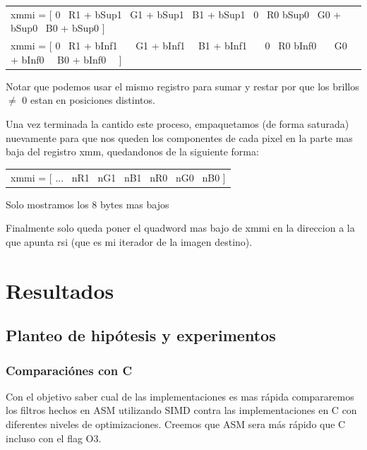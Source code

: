 \documentclass[a4paper]{article}
\begin{document}
\begin{center}
	\begin{tabular}{l}
		xmmi = [ 0 \textpipe\ R1 + bSup1 \textpipe\ G1 + bSup1 \textpipe\ B1 + bSup1 \textpipe\ 0 \textpipe\ R0 bSup0 \textpipe\ G0 + bSup0 \textpipe\ B0 + bSup0 ] \\
		
		xmmi = [ 0 \textpipe\ R1 + bInf1 \ \  \textpipe\ G1 + bInf1 \ \textpipe\ B1 + bInf1 \ \ \textpipe\ 0 \textpipe\ R0 bInf0 \ \ \textpipe\ G0 + bInf0 \ \textpipe\ B0 + bInf0 \ \ ]
		 
	\end{tabular}
\end{center}

Notar que podemos usar el mismo registro para sumar y restar por que los brillos $\neq$ 0 estan en posiciones distintos.

Una vez terminada la cantido este proceso, empaquetamos (de forma saturada) nuevamente para que nos queden los componentes de cada pixel en la parte mas baja del registro xmm, quedandonos de la siguiente forma:

\begin{center}
	\begin{tabular}{l}
		xmmi = [ ... \textpipe\ nR1 \textpipe\ nG1 \textpipe\ nB1 \textpipe\ nR0 \textpipe\ nG0 \textpipe\ nB0 ]
	\end{tabular}
	
	Solo mostramos los 8 bytes mas bajos
\end{center}


Finalmente solo queda poner el quadword mas bajo de xmmi en la direccion a la que apunta rsi (que es mi iterador de la imagen destino).

\section{Resultados}
\subsection{Planteo de hipótesis y experimentos}

\subsubsection{Comparaci\'ones con C}

Con el objetivo saber cual de las implementaciones es mas r\'apida compararemos los filtros hechos en ASM utilizando SIMD contra las implementaciones en C con diferentes niveles de optimizaciones. Creemos que ASM sera m\'as r\'apido que C incluso con el flag O3.
\end{document}
